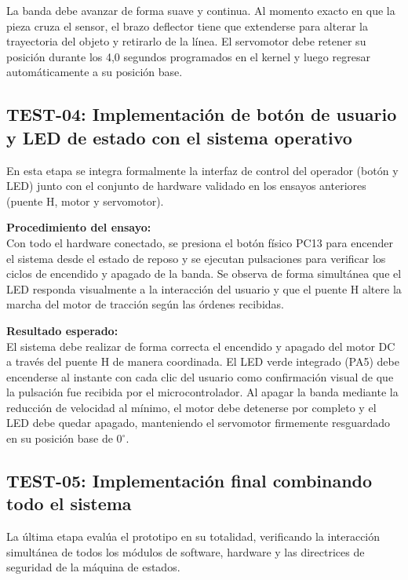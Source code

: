 \documentclass[12pt, letterpaper]{article}
\begin{document}
La banda debe avanzar de forma suave y continua. Al momento exacto en que la pieza cruza el sensor, el brazo deflector tiene que extenderse para alterar la trayectoria del objeto y retirarlo de la línea. El servomotor debe retener su posición durante los 4,0 segundos programados en el kernel y luego regresar automáticamente a su posición base.

\subsection{TEST-04: Implementación de botón de usuario y LED de estado con el sistema operativo}
En esta etapa se integra formalmente la interfaz de control del operador (botón y LED) junto con el conjunto de hardware validado en los ensayos anteriores (puente H, motor y servomotor).

\vspace{0.5cm}

\noindent \textbf{Procedimiento del ensayo:} \\

Con todo el hardware conectado, se presiona el botón físico PC13 para encender el sistema desde el estado de reposo y se ejecutan pulsaciones para verificar los ciclos de encendido y apagado de la banda. Se observa de forma simultánea que el LED responda visualmente a la interacción del usuario y que el puente H altere la marcha del motor de tracción según las órdenes recibidas.

\vspace{0.5cm}

\noindent \textbf{Resultado esperado:} \\

El sistema debe realizar de forma correcta el encendido y apagado del motor DC a través del puente H de manera coordinada. El LED verde integrado (PA5) debe encenderse al instante con cada clic del usuario como confirmación visual de que la pulsación fue recibida por el microcontrolador. Al apagar la banda mediante la reducción de velocidad al mínimo, el motor debe detenerse por completo y el LED debe quedar apagado, manteniendo el servomotor firmemente resguardado en su posición base de $0^\circ$.

\subsection{TEST-05: Implementación final combinando todo el sistema}
La última etapa evalúa el prototipo en su totalidad, verificando la interacción simultánea de todos los módulos de software, hardware y las directrices de seguridad de la máquina de estados.
\end{document}
